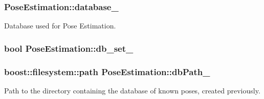 \hypertarget{classPoseEstimation_a4c10437a72b2b8ac97cf92a55ee12236}{
\subsubsection[{database\-\_\-}]{ Pose\-Estimation\-::database\-\_\-\hspace{0.3cm}{\ttfamily [private]}}}\label{classPoseEstimation_a4c10437a72b2b8ac97cf92a55ee12236}


Database used for Pose Estimation. 

\hypertarget{classPoseEstimation_a86f675bcf1d652f32c3241f593a981ac}{
\subsubsection[{db\-\_\-set\-\_\-}]{\setlength{\rightskip}{0pt plus 5cm}bool Pose\-Estimation\-::db\-\_\-set\-\_\-\hspace{0.3cm}{\ttfamily [private]}}}\label{classPoseEstimation_a86f675bcf1d652f32c3241f593a981ac}
\hypertarget{classPoseEstimation_acac4c572e8500c78522eb1a741c908cb}{
\subsubsection[{db\-Path\-\_\-}]{\setlength{\rightskip}{0pt plus 5cm}boost\-::filesystem\-::path Pose\-Estimation\-::db\-Path\-\_\-\hspace{0.3cm}{\ttfamily [private]}}}\label{classPoseEstimation_acac4c572e8500c78522eb1a741c908cb}


Path to the directory containing the database of known poses, created previously. 


